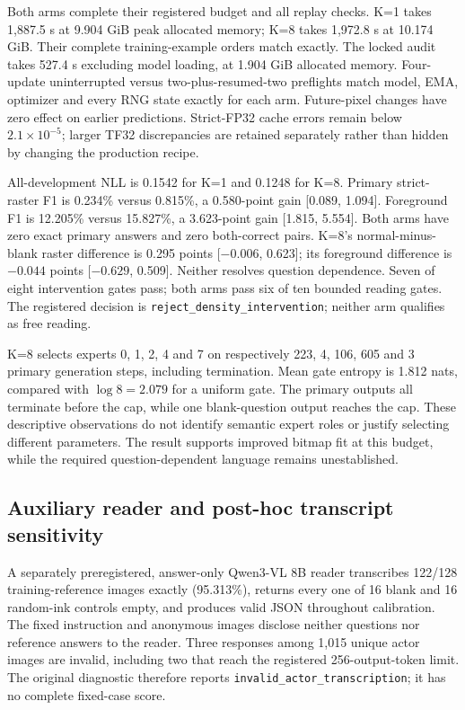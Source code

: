 \documentclass[10pt,a4paper]{article}
\begin{document}
Both arms complete their registered budget and all replay checks. K=1 takes
1,887.5 s at 9.904 GiB peak allocated memory; K=8 takes 1,972.8 s at 10.174 GiB.
Their complete training-example orders match exactly. The locked audit takes
527.4 s excluding model loading, at 1.904 GiB allocated memory. Four-update
uninterrupted versus two-plus-resumed-two preflights match model, EMA,
optimizer and every RNG state exactly for each arm. Future-pixel changes
have zero effect on earlier predictions. Strict-FP32 cache errors remain
below $2.1\times10^{-5}$; larger TF32 discrepancies are retained separately
rather than hidden by changing the production recipe.

All-development NLL is 0.1542 for K=1 and 0.1248 for K=8. Primary strict-raster
F1 is 0.234\% versus 0.815\%, a 0.580-point gain [0.089, 1.094]. Foreground
F1 is 12.205\% versus 15.827\%, a 3.623-point gain [1.815, 5.554]. Both
arms have zero exact primary answers and zero both-correct pairs. K=8's
normal-minus-blank raster difference is 0.295 points [$-0.006$, 0.623]; its
foreground difference is $-0.044$ points [$-0.629$, 0.509]. Neither resolves
question dependence. Seven of eight intervention gates pass; both arms pass
six of ten bounded reading gates. The registered decision is
\texttt{reject\_density\_intervention}; neither arm qualifies as free reading.

K=8 selects experts 0, 1, 2, 4 and 7 on respectively 223, 4, 106, 605 and 3
primary generation steps, including termination. Mean gate entropy is 1.812
nats, compared with $\log 8=2.079$ for a uniform gate. The primary outputs all
terminate before the cap, while one blank-question output reaches the cap.
These descriptive observations do not identify semantic expert roles or
justify selecting different parameters. The result supports improved bitmap
fit at this budget, while the required question-dependent language remains
unestablished.

\subsection*{Auxiliary reader and post-hoc transcript sensitivity}
A separately preregistered, answer-only Qwen3-VL 8B reader transcribes
122/128 training-reference images exactly (95.313\%), returns every one of
16 blank and 16 random-ink controls empty, and produces valid JSON throughout
calibration. The fixed instruction and anonymous images disclose neither
questions nor reference answers to the reader. Three responses among 1,015
unique actor images are invalid, including two that reach the registered
256-output-token limit. The original diagnostic therefore reports
\texttt{invalid\_actor\_transcription}; it has no complete fixed-case score.
\end{document}
